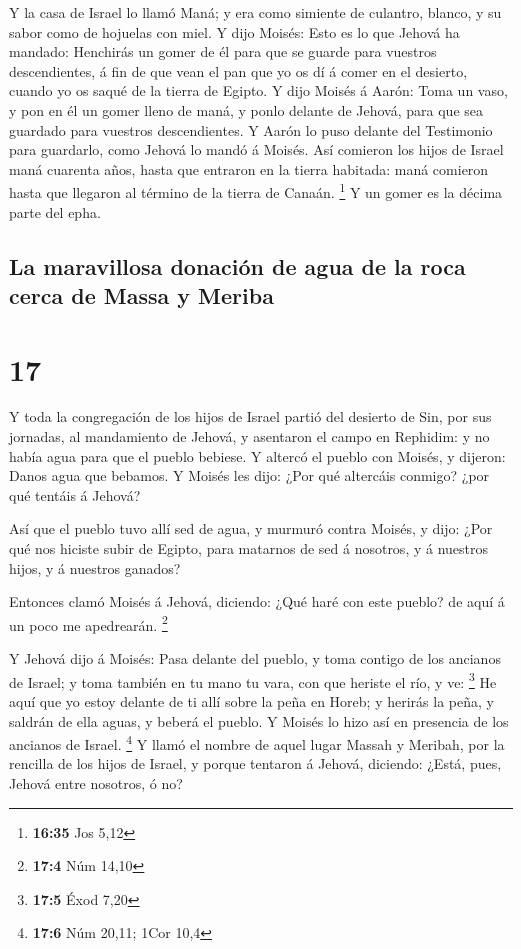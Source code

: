  Y la casa de Israel lo llamó Maná; y era como simiente de
culantro, blanco, y su sabor como de hojuelas con miel.  Y
dijo Moisés: Esto es lo que Jehová ha mandado: Henchirás un gomer de él
para que se guarde para vuestros descendientes, á fin de que vean el pan
que yo os dí á comer en el desierto, cuando yo os saqué de la tierra de
Egipto.  Y dijo Moisés á Aarón: Toma un vaso, y pon en él
un gomer lleno de maná, y ponlo delante de Jehová, para que sea guardado
para vuestros descendientes.  Y Aarón lo puso delante del
Testimonio para guardarlo, como Jehová lo mandó á Moisés. 
Así comieron los hijos de Israel maná cuarenta años, hasta que entraron
en la tierra habitada: maná comieron hasta que llegaron al término de la
tierra de Canaán. \footnote{\textbf{16:35} Jos 5,12}  Y un
gomer es la décima parte del epha.

\hypertarget{la-maravillosa-donaciuxf3n-de-agua-de-la-roca-cerca-de-massa-y-meriba}{%
\subsection{La maravillosa donación de agua de la roca cerca de Massa y
Meriba}\label{la-maravillosa-donaciuxf3n-de-agua-de-la-roca-cerca-de-massa-y-meriba}}

\hypertarget{section-16}{%
\section{17}\label{section-16}}

 Y toda la congregación de los hijos de Israel partió del
desierto de Sin, por sus jornadas, al mandamiento de Jehová, y asentaron
el campo en Rephidim: y no había agua para que el pueblo bebiese.
 Y altercó el pueblo con Moisés, y dijeron: Danos agua que
bebamos. Y Moisés les dijo: ¿Por qué altercáis conmigo? ¿por qué tentáis
á Jehová?

 Así que el pueblo tuvo allí sed de agua, y murmuró contra
Moisés, y dijo: ¿Por qué nos hiciste subir de Egipto, para matarnos de
sed á nosotros, y á nuestros hijos, y á nuestros ganados?

 Entonces clamó Moisés á Jehová, diciendo: ¿Qué haré con
este pueblo? de aquí á un poco me apedrearán. \footnote{\textbf{17:4}
  Núm 14,10}

 Y Jehová dijo á Moisés: Pasa delante del pueblo, y toma
contigo de los ancianos de Israel; y toma también en tu mano tu vara,
con que heriste el río, y ve: \footnote{\textbf{17:5} Éxod 7,20}
 He aquí que yo estoy delante de ti allí sobre la peña en
Horeb; y herirás la peña, y saldrán de ella aguas, y beberá el pueblo. Y
Moisés lo hizo así en presencia de los ancianos de Israel. \footnote{\textbf{17:6}
  Núm 20,11; 1Cor 10,4}  Y llamó el nombre de aquel lugar
Massah y Meribah, por la rencilla de los hijos de Israel, y porque
tentaron á Jehová, diciendo: ¿Está, pues, Jehová entre nosotros, ó no?

